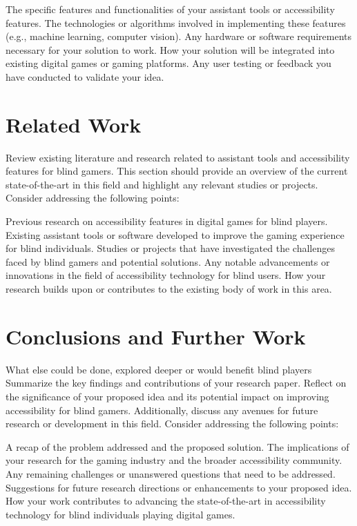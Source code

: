 \documentclass[sigconf,natbib=false,10pt]{acmart}
\begin{document}
	The specific features and functionalities of your assistant tools or accessibility features.
	The technologies or algorithms involved in implementing these features (e.g., machine learning, computer vision).
	Any hardware or software requirements necessary for your solution to work.
	How your solution will be integrated into existing digital games or gaming platforms.
	Any user testing or feedback you have conducted to validate your idea.
	
	\section{Related Work}
	Review existing literature and research related to assistant tools and accessibility features for blind gamers. This section should provide an overview of the current state-of-the-art in this field and highlight any relevant studies or projects. Consider addressing the following points:
	
	Previous research on accessibility features in digital games for blind players.
	Existing assistant tools or software developed to improve the gaming experience for blind individuals.
	Studies or projects that have investigated the challenges faced by blind gamers and potential solutions.
	Any notable advancements or innovations in the field of accessibility technology for blind users.
	How your research builds upon or contributes to the existing body of work in this area.
	
	\section{Conclusions and Further Work}
	What else could be done, explored deeper or would benefit blind players
	Summarize the key findings and contributions of your research paper. Reflect on the significance of your proposed idea and its potential impact on improving accessibility for blind gamers. Additionally, discuss any avenues for future research or development in this field. Consider addressing the following points:
	
	A recap of the problem addressed and the proposed solution.
	The implications of your research for the gaming industry and the broader accessibility community.
	Any remaining challenges or unanswered questions that need to be addressed.
	Suggestions for future research directions or enhancements to your proposed idea.
	How your work contributes to advancing the state-of-the-art in accessibility technology for blind individuals playing digital games.
	
	
	\printbibliography
	
\end{document}
